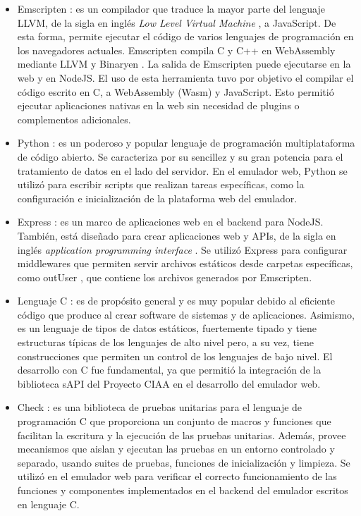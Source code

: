 \begin{itemize}
	\item Emscripten \citep{Emscripten}: es un compilador que traduce la mayor parte del lenguaje LLVM, de la sigla en inglés \textit{Low Level Virtual Machine} \citep{LLVM}, a JavaScript. De esta forma, permite ejecutar el código de varios lenguajes de programación en los navegadores actuales.
Emscripten compila C y C++ en WebAssembly \citep{WebAssembly} mediante LLVM y Binaryen \citep{Binaryen}. La salida de Emscripten puede ejecutarse en la web y en NodeJS.
El uso de esta herramienta tuvo por objetivo el compilar el código escrito en C, a WebAssembly (Wasm) y JavaScript.	Esto permitió ejecutar aplicaciones nativas en la web sin necesidad de plugins o complementos adicionales.

	\item Python \citep{Python}:  es un poderoso y popular lenguaje de programación multiplataforma de código abierto. Se caracteriza por su sencillez y su gran potencia para el tratamiento de datos en el lado del servidor. En el emulador web, Python se utilizó para escribir scripts que realizan tareas específicas, como la configuración e inicialización de la plataforma web del emulador.
    
    \item Express \citep{Express}: es un marco de aplicaciones web en el backend para NodeJS. También, está diseñado para crear aplicaciones web y APIs, de la sigla en inglés \textit{application programming interface} \citep{API}. Se utilizó Express para configurar middlewares que permiten servir archivos estáticos desde carpetas específicas, como \textquotedbl outUser \textquotedbl, que contiene los archivos generados por Emscripten.
    
    \item Lenguaje C \citep{LenguajeC}: es de propósito general y es muy popular debido al eficiente código que produce al crear software de sistemas y de aplicaciones. 
    Asimismo, es un lenguaje de tipos de datos estáticos, fuertemente tipado y tiene estructuras típicas de los lenguajes de alto nivel pero, a su vez, tiene construcciones que permiten un control de los lenguajes de bajo nivel. El desarrollo con C fue fundamental, ya que permitió la integración de la biblioteca sAPI del Proyecto  CIAA en el desarrollo del emulador web.
        
    \item Check \citep{Check}: es una biblioteca de pruebas unitarias para el lenguaje de programación C que proporciona un conjunto de macros y funciones que facilitan la escritura y la ejecución de las pruebas unitarias. Además, provee mecanismos que aislan y ejecutan las pruebas en un entorno controlado y separado, usando suites de pruebas, funciones de inicialización y limpieza. Se utilizó en el emulador web para verificar el correcto funcionamiento de las funciones y componentes implementados en el backend del emulador escritos en lenguaje C.
    

\end{itemize}
